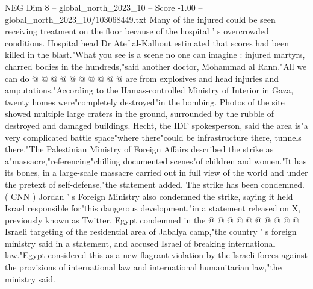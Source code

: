 \begin{textsample}{NEG Dim 8 – global\_north\_2023\_10 – Score -1.00 – global\_north\_2023\_10/103068449.txt}
Many of the injured could be seen receiving treatment on the floor because of the hospital ' s overcrowded conditions.
Hospital head Dr Atef al-Kalhout estimated that scores had been killed in the blast."What you see is a scene no one can imagine : injured martyrs, charred bodies in the hundreds,"said another doctor, Mohammad al Rann."All we can do @ @ @ @ @ @ @ @ @ @ are from explosives and head injuries and amputations."According to the Hamas-controlled Ministry of Interior in Gaza, twenty homes were"completely destroyed"in the bombing.
Photos of the site showed multiple large craters in the ground, surrounded by the rubble of destroyed and damaged buildings.
Hecht, the IDF spokesperson, said the area is"a very complicated battle space"where there"could be infrastructure there, tunnels there."The Palestinian Ministry of Foreign Affairs described the strike as a"massacre,"referencing"chilling documented scenes"of children and women."It has its bones, in a large-scale massacre carried out in full view of the world and under the pretext of self-defense,"the statement added.
The strike has been condemned. ( CNN ) Jordan ' s Foreign Ministry also condemned the strike, saying it held Israel responsible for"this dangerous development,"in a statement released on X, previously known as Twitter.
Egypt condemned in the @ @ @ @ @ @ @ @ @ @ Israeli targeting of the residential area of Jabalya camp,"the country ' s foreign ministry said in a statement, and accused Israel of breaking international law."Egypt considered this as a new flagrant violation by the Israeli forces against the provisions of international law and international humanitarian law,"the ministry said.

\end{textsample}
